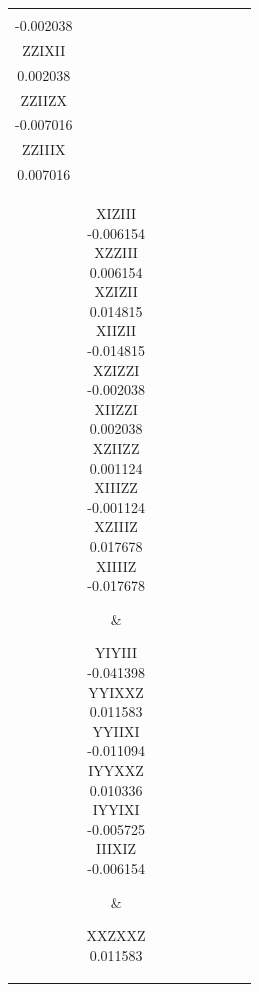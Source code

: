 \documentclass[twocolumn]{revtex4-1}
\newcommand{\1}{\mathbbm{1}}
\begin{document}
\begin{longtable}{|c|c|c|c|c|c|c|c|c|}
{ZZIXZI\\
-0.002038\\ 
ZZIXII\\
0.002038\\ 
ZZIIZX\\
-0.007016\\ 
ZZIIIX\\
0.007016\\ 
\vspace{.5\baselineskip}}
&
\parbox{1.9cm}{\centering\vspace{.5\baselineskip}
XIZIII\\
-0.006154\\ 
XZZIII\\
0.006154\\ 
XZIZII\\
0.014815\\ 
XIIZII\\
-0.014815\\ 
XZIZZI\\
-0.002038\\ 
XIIZZI\\
0.002038\\ 
XZIIZZ\\
0.001124\\ 
XIIIZZ\\
-0.001124\\ 
XZIIIZ\\
0.017678\\ 
XIIIIZ\\
-0.017678\\ 
\vspace{.5\baselineskip}}
&
\parbox{1.9cm}{\centering\vspace{.5\baselineskip}
YIYIII\\
-0.041398\\ 
YYIXXZ\\
0.011583\\ 
YYIIXI\\
-0.011094\\ 
IYYXXZ\\
0.010336\\ 
IYYIXI\\
-0.005725\\ 
IIIXIZ\\
-0.006154\\ 
\vspace{.5\baselineskip}}
&
\parbox{1.9cm}{\centering\vspace{.5\baselineskip}
XXZXXZ\\
0.011583\\ 
}
\end{longtable}
\end{document}

